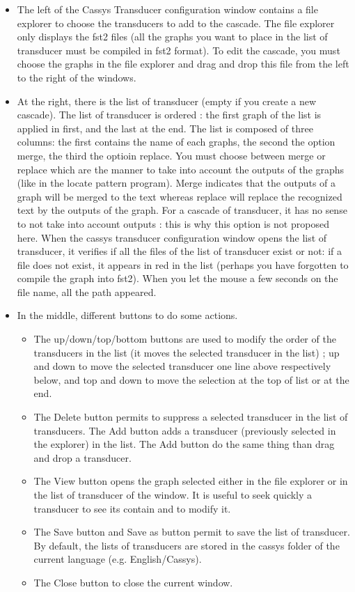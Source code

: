 \begin{itemize}
	\item The left of the Cassys Transducer configuration window contains a file explorer to choose the transducers to add to the cascade. 
	The file explorer only displays the fst2 files (all the graphs you want to place in the list of transducer must be compiled in fst2 format). 
	To edit the cascade, you must choose the graphs in the file explorer and drag and drop this file from the left to the right of the windows.
	\item At the right, there is the list of transducer (empty if you create a new cascade).
	The list of transducer is ordered : the first graph of the list is applied in first, and the last at the end. The list is composed of three columns: the first contains 	the name of each graphs, the second the option merge, the third the optioin replace. You must choose between merge or replace which are the manner to take into account 	the outputs of the graphs (like in the locate pattern program). Merge indicates that the outputs of a graph will be merged to the text whereas replace will replace the 	recognized text by the outputs of the graph. For a cascade of transducer, it has no sense to not take into account outputs : this is why this option is not proposed 		here.
 	When the cassys transducer configuration window opens the list of transducer, it verifies if all the files of the list of transducer exist or not: if a file does not 	exist, it appears in red in the list (perhaps you have forgotten to compile the graph into fst2). 
	When you let the mouse a few seconds on the file name, all the path appeared. 
	\item In the middle, different buttons to do some actions. 
		\begin{itemize}
			\item The up/down/top/bottom buttons are used to modify the order of the transducers in the list (it moves the selected transducer in the list) ; 
			up and down to move the selected transducer one line above respectively below, and top and down to move the selection at the top of list or at the end.
			\item  The Delete button permits to suppress a selected transducer in the list of transducers. The Add button adds a transducer (previously selected in the explorer) in the list. The Add button do the same thing than drag and drop a transducer. 
			\item The View button opens the graph selected either in the file explorer or in the list of transducer of the window. It is useful to seek quickly a transducer to see its contain and to modify it.
			\item The Save button and Save as button permit to save the list of transducer. By default, the lists of transducers are stored in the cassys folder of the current language (e.g. English/Cassys).
			\item The Close button to close the current window.
		\end{itemize}
\end{itemize}

